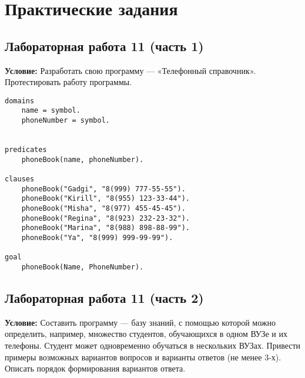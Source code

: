 \chapter{Практические задания}

\section{Лабораторная работа 11 (часть 1)}

\textbf{Условие:} Разработать  свою  программу --- «Телефонный справочник». Протестировать работу программы.

\begin{lstlisting}    
domains
	name = symbol.
	phoneNumber = symbol.
	
	
predicates
	phoneBook(name, phoneNumber).
	
clauses
	phoneBook("Gadgi", "8(999) 777-55-55").
	phoneBook("Kirill", "8(955) 123-33-44").
	phoneBook("Misha", "8(977) 455-45-45").
	phoneBook("Regina", "8(923) 232-23-32").
	phoneBook("Marina", "8(988) 898-88-99").
	phoneBook("Ya", "8(999) 999-99-99").
	
goal
	phoneBook(Name, PhoneNumber).
\end{lstlisting}


\section{Лабораторная работа 11 (часть 2)}

\textbf{Условие:} Составить программу --- базу знаний, с помощью которой можно определить, например, множество  студентов,  обучающихся  в  одном  ВУЗе и  их  телефоны. Студент  может одновременно обучаться в нескольких ВУЗах. Привести примеры возможных вариантов вопросов и варианты ответов (не менее 3-х). Описать порядок формирования вариантов ответа.


